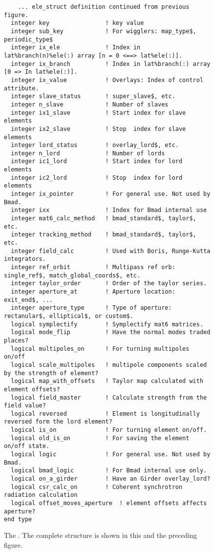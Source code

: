 
\begin{figure}[tb]
\centering
\footnotesize
\begin{verbatim}
    ... ele_struct definition continued from previous figure.
  integer key                ! key value
  integer sub_key            ! For wigglers: map_type$, periodic_type$
  integer ix_ele             ! Index in lat%branch(n)%ele(:) array [n = 0 <==> lat%ele(:)].
  integer ix_branch          ! Index in lat%branch(:) array [0 => In lat%ele(:)].
  integer ix_value           ! Overlays: Index of control attribute. 
  integer slave_status       ! super_slave$, etc.
  integer n_slave            ! Number of slaves
  integer ix1_slave          ! Start index for slave elements
  integer ix2_slave          ! Stop  index for slave elements
  integer lord_status        ! overlay_lord$, etc.
  integer n_lord             ! Number of lords
  integer ic1_lord           ! Start index for lord elements
  integer ic2_lord           ! Stop  index for lord elements
  integer ix_pointer         ! For general use. Not used by Bmad.
  integer ixx                ! Index for Bmad internal use
  integer mat6_calc_method   ! bmad_standard$, taylor$, etc.
  integer tracking_method    ! bmad_standard$, taylor$, etc.
  integer field_calc         ! Used with Boris, Runge-Kutta integrators.
  integer ref_orbit          ! Multipass ref orb: single_ref$, match_global_coords$, etc.
  integer taylor_order       ! Order of the taylor series.
  integer aperture_at        ! Aperture location: exit_end$, ...
  integer aperture_type      ! Type of aperture: rectanular$, elliptical$, or custom$. 
  logical symplectify        ! Symplectify mat6 matrices.
  logical mode_flip          ! Have the normal modes traded places?
  logical multipoles_on      ! For turning multipoles on/off
  logical scale_multipoles   ! multipole components scaled by the strength of element?
  logical map_with_offsets   ! Taylor map calculated with element offsets?
  logical field_master       ! Calculate strength from the field value?
  logical reversed           ! Element is longitudinally reversed form the lord element?
  logical is_on              ! For turning element on/off.
  logical old_is_on          ! For saving the element on/off state.
  logical logic              ! For general use. Not used by Bmad.
  logical bmad_logic         ! For Bmad internal use only.
  logical on_a_girder        ! Have an Girder overlay_lord?
  logical csr_calc_on        ! Coherent synchrotron radiation calculation
  logical offset_moves_aperture  ! element offsets affects aperture?          
end type
\end{verbatim}
\caption[The  (part 2).]{The . 
The complete structure is shown in this and the preceding figure.}
\label{f:ele.struct2}
\end{figure}

